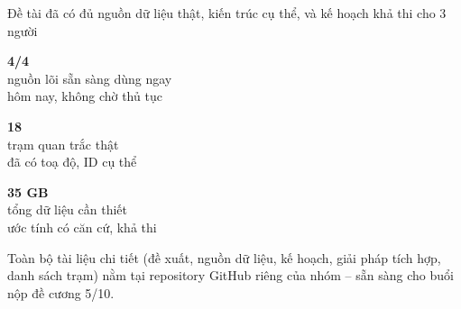 \documentclass[t, aspectratio=169]{beamer}
\newcommand{\bignum}[4]{%
  \begin{minipage}[t]{#4}
    \centering
    {\fontsize{32}{36}\selectfont\bfseries\color{#3} #1}\\[2pt]
    {\small #2}
  \end{minipage}%
}
\begin{document}
\begin{frame}{Đề tài đã có đủ nguồn dữ liệu thật, kiến trúc cụ thể, và kế hoạch khả thi cho 3 người}
\begin{center}
\bignum{4/4}{nguồn lõi sẵn sàng dùng ngay\\hôm nay, không chờ thủ tục}{goodgreen}{4.2cm}
\bignum{18}{trạm quan trắc thật\\đã có toạ độ, ID cụ thể}{goodgreen}{4.2cm}
\bignum{35 GB}{tổng dữ liệu cần thiết\\ước tính có căn cứ, khả thi}{goodgreen}{4.2cm}
\end{center}
\vspace{0.4cm}
\centering\small
Toàn bộ tài liệu chi tiết (đề xuất, nguồn dữ liệu, kế hoạch, giải pháp tích hợp, danh sách trạm)
nằm tại repository GitHub riêng của nhóm -- sẵn sàng cho buổi nộp đề cương 5/10.
\end{frame}

\hustthankyou
\end{document}

